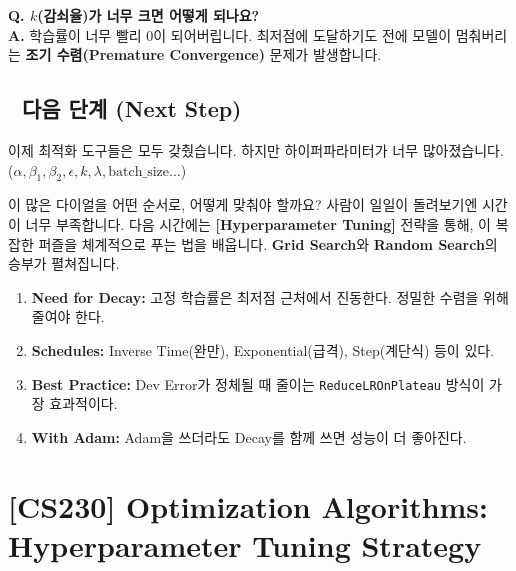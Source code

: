 \documentclass[11pt,a4paper]{book}
\theoremstyle{definition}
\begin{document}
\textbf{Q. $k$(감쇠율)가 너무 크면 어떻게 되나요?} \\
\textbf{A.} 학습률이 너무 빨리 0이 되어버립니다. 최저점에 도달하기도 전에 모델이 멈춰버리는 \textbf{조기 수렴(Premature Convergence)} 문제가 발생합니다.

\section*{🔗 다음 단계 (Next Step)}
이제 최적화 도구들은 모두 갖췄습니다. 하지만 하이퍼파라미터가 너무 많아졌습니다.
($\alpha, \beta_1, \beta_2, \epsilon, k, \lambda, \text{batch\_size} \dots$)

이 많은 다이얼을 어떤 순서로, 어떻게 맞춰야 할까요? 사람이 일일이 돌려보기엔 시간이 너무 부족합니다.
다음 시간에는 \textbf{[Hyperparameter Tuning]} 전략을 통해, 이 복잡한 퍼즐을 체계적으로 푸는 법을 배웁니다. \textbf{Grid Search}와 \textbf{Random Search}의 승부가 펼쳐집니다.

\vspace{0.5cm}

\begin{summarybox}[title={단원 요약 (Cheat Sheet)}]
\begin{enumerate}
    \item \textbf{Need for Decay:} 고정 학습률은 최저점 근처에서 진동한다. 정밀한 수렴을 위해 줄여야 한다.
    \item \textbf{Schedules:} Inverse Time(완만), Exponential(급격), Step(계단식) 등이 있다.
    \item \textbf{Best Practice:} Dev Error가 정체될 때 줄이는 \texttt{ReduceLROnPlateau} 방식이 가장 효과적이다.
    \item \textbf{With Adam:} Adam을 쓰더라도 Decay를 함께 쓰면 성능이 더 좋아진다.
\end{enumerate}
\end{summarybox}


\chapter{[CS230] Optimization Algorithms: \\ Hyperparameter Tuning Strategy}
\label{ch:lecture20}

\end{document}
